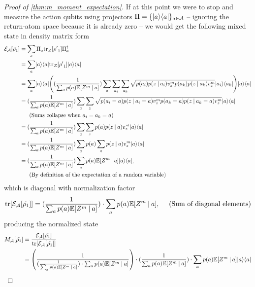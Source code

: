 \documentclass{article}
\DeclarePairedDelimiter{\bra}{\langle}{\rvert} %
\DeclarePairedDelimiter{\ket}{\lvert}{\rangle} %
\DeclarePairedDelimiter{\paren}{\lparen}{\rparen} %
\DeclarePairedDelimiter{\bparen}{[}{]} %
\newcommand{\E}{\mathbb{E}} %
\newcommand{\bfunc}[2]{#1\bparen*{#2}} %
\newcommand{\given}[1][]{\:#1\vert\:}
\begin{document}
\begin{proof}[Proof of \cref{thm:m_moment_expectation}]
If at this point we were to stop and measure the action qubits using projectors $\Pi = \{\ket{a}\bra{a}\}_{a \in \mathcal{A}}$ -- ignoring the return-atom space because it is already zero -- we would get the following mixed state in density matrix form
% 
\begin{align}
\bfunc{\mathcal{E}_{\mathcal{A}}}{\tilde{\rho_1}}
&= \sum_{a} \Pi_a \bfunc{\textrm{tr}_{\mathcal{Z}}}{{\rho'}_1} \Pi^{\dagger}_a
\\&= \sum_{a} \ket{a}\bra{a} \bfunc{\textrm{tr}_{\mathcal{Z}}}{{\rho'}_1} \ket{a}\bra{a}
% 
\\&= \sum_{a} \ket{a}\bra{a} \paren*{(\frac{1}{\sum_{a} p(a) \bfunc{\mathbb{E}}{Z^{m} \given a}}) \sum_{z} \sum_{a_i} \sum_{a_k} \sqrt{p(a_i) p(z \given a_i) v_{z}^{m} p(a_k) p(z \given a_k) v_{z}^{m}} \ket{a_i}\bra{a_k}} \ket{a}\bra{a}
% 
\\&= (\frac{1}{\sum_{a} p(a) \bfunc{\mathbb{E}}{Z^{m} \given a}}) \sum_{a} \sum_{z} \sqrt{p(a_i=a) p(z \given a_i=a) v_{z}^{m} p(a_k=a) p(z \given a_k=a) v_{z}^{m}} \ket{a}\bra{a} 
\\&~~~~~\textrm{(Sums collapse when} ~ a_i = a_k = a \textrm{)}\nonumber
\\&= (\frac{1}{\sum_{a} p(a) \bfunc{\mathbb{E}}{Z^{m} \given a}}) \sum_{a} \sum_{z} p(a) p(z \given a) v_{z}^{m} \ket{a}\bra{a}
\\&= (\frac{1}{\sum_{a} p(a) \bfunc{\mathbb{E}}{Z^{m} \given a}}) \sum_{a} p(a) \sum_{z} p(z \given a) v_{z}^{m} \ket{a}\bra{a}
\\&= (\frac{1}{\sum_{a} p(a) \bfunc{\mathbb{E}}{Z^{m} \given a}}) \sum_{a} p(a) \mathbb{E}[Z^m \given a] \ket{a}\bra{a},
\\&~~~~~\textrm{(By definition of the expectation of a random variable)} \nonumber
\end{align}
% 
which is diagonal with normalization factor
% 
\begin{align}
\bfunc{\textrm{tr}}{\bfunc{\mathcal{E}_{\mathcal{A}}}{\tilde{\rho_1}}} = (\frac{1}{\sum_{a} p(a) \bfunc{\mathbb{E}}{Z^{m} \given a}}) \cdot \sum_{a} p(a) \bfunc{\mathbb{E}}{Z^{m} \given a}, ~~~~\textrm{(Sum of diagonal elements)}
\end{align}
% 
producing the normalized state
% 
\begin{align}
\bfunc{M_{\mathcal{A}}}{\tilde{\rho_1}}
&=\frac{\bfunc{\mathcal{E}_{\mathcal{A}}}{\tilde{\rho_1}}}{\bfunc{\textrm{tr}}{\bfunc{\mathcal{E}_{\mathcal{A}}}{\tilde{\rho_1}}}}
\\&= \paren*{\frac{1}{(\frac{1}{\sum_{a} p(a) \bfunc{\mathbb{E}}{Z^{m} \given a}}) \cdot \sum_{a} p(a) \bfunc{\mathbb{E}}{Z^{m} \given a}}} \cdot (\frac{1}{\sum_{a} p(a) \bfunc{\mathbb{E}}{Z^{m} \given a}}) \cdot \sum_{a} p(a) \bfunc{\mathbb{E}}{Z^{m} \given a} \ket{a}\bra{a}

\end{align}
\end{proof}
\end{document}
